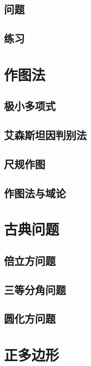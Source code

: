 \documentclass[cn,fancy,blue,11pt]{elegantbook}
\begin{document}
\section{问题}

\section{练习}




\appendix

\chapter{作图法}

\section{极小多项式}

\section{艾森斯坦因判别法}

\section{尺规作图}

\section{作图法与域论}

\chapter{古典问题}

\section{倍立方问题}

\section{三等分角问题}

\section{圆化方问题}

\chapter{正多边形}
\end{document}
